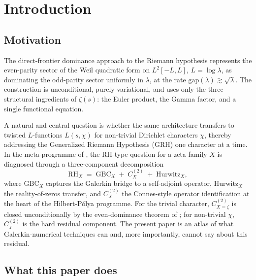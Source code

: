 \documentclass[10pt,twocolumn]{article}
\theoremstyle{definition}
\theoremstyle{remark}
\newcommand{\chifn}{\chi}
\begin{document}
\section{Introduction}
\label{sec:intro}

\subsection{Motivation}
\label{sec:intro-motivation}

The direct-frontier dominance approach to the Riemann hypothesis
\cite{RH_II} represents the even-parity sector of the Weil quadratic form
on $L^2[-L,L]$, $L=\log\lambda$, as dominating the odd-parity sector
uniformly in $\lambda$, at the rate
$\mathrm{gap}(\lambda)\gtrsim\sqrt{\lambda}$. The construction is
unconditional, purely variational, and uses only the three structural
ingredients of $\zeta(s)$: the Euler product, the Gamma factor, and
a single functional equation.

A natural and central question is whether the same architecture
transfers to twisted $L$-functions $L(s,\chi)$ for non-trivial
Dirichlet characters $\chi$, thereby addressing the Generalized
Riemann Hypothesis (GRH) one character at a time. In the meta-programme
of \cite{MetaGalerkinBridge}, the RH-type question for a zeta family
$X$ is diagnosed through a three-component decomposition
\begin{equation}
\label{eq:three-component}
  \mathrm{RH}_X
    \;=\;
  \mathrm{GBC}_X \;+\; C^{(2)}_X \;+\; \mathrm{Hurwitz}_X,
\end{equation}
where $\mathrm{GBC}_X$ captures the Galerkin bridge to a self-adjoint
operator, $\mathrm{Hurwitz}_X$ the reality-of-zeros transfer, and
$C^{(2)}_X$ the Connes-style operator identification at the heart of the
Hilbert-P\'olya programme. For the trivial character,
$C^{(2)}_{X=\zeta}$ is closed unconditionally by the even-dominance
theorem of \cite{RH_II}; for non-trivial $\chi$, $C^{(2)}_{\chifn}$ is
the hard residual component. The present paper is an atlas of what
Galerkin-numerical techniques can and, more importantly, cannot say
about this residual.

\subsection{What this paper does}
\label{sec:intro-contribution}
\end{document}
